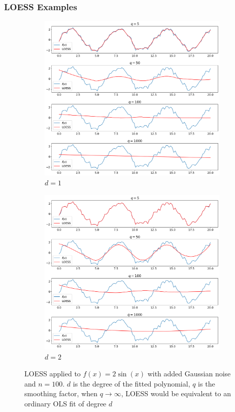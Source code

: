 \documentclass[presentation.tex]{subfiles}
\begin{document}
\begin{frame}
  \frametitle{LOESS Examples}
  \begin{figure}
    \centering
    \begin{subfigure}[b]{0.49\textwidth}
      \centering
      \includegraphics[width=\textwidth]{imgs/loess1}
      \caption{$d=1$}
  \end{subfigure}
  \begin{subfigure}[b]{0.49\textwidth}
    \centering
    \includegraphics[width=\textwidth]{imgs/loess2}
    \caption{$d=2$}
  \end{subfigure}
  \caption{LOESS applied to $f(x) = 2\sin(x)$ with added Gaussian noise and $n =
    100$. $d$ is the degree of the fitted polynomial, $q$ is the smoothing factor, when
    $q \rightarrow \infty$, LOESS would be equivalent to an ordinary OLS fit of degree $d$}
\end{figure}
\end{frame}
\end{document}
